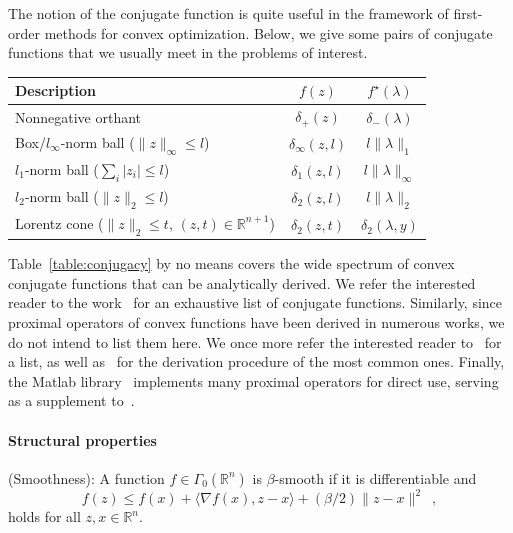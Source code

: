 \documentclass[openany]{now}
\newcommand{\reals}{{\mathbb R}}
\begin{document}
The notion of the conjugate function is quite useful in the framework of first-order methods for convex optimization.
Below, we give some pairs of conjugate functions that we usually meet in the problems of interest.
\begin{center}
    \begin{tabular}{ | l | c | c | }
    \hline
     Description & $f(z)$ & $f^{\star}(\lambda)$ \\ \hline\hline
     Nonnegative orthant & $\delta_+(z)$ & $\delta_-(\lambda)$ \\ \hline
     Box/$l_\infty$-norm ball ($\|z\|_{\infty}\leq l$) & $\delta_{\infty}(z,l)$ & $l\|\lambda\|_1$ \\ \hline
     $l_1$-norm ball ($\sum_i |z_i|\leq l$)  & $\delta_1(z,l)$ & $l\|\lambda\|_{\infty}$ \\ \hline
     $l_2$-norm ball ($\|z\|_2\leq l$)  & $\delta_2(z,l)$ & $l\|\lambda\|_2$ \\ \hline
     Lorentz cone ($\|z\|_2\leq t$, $(z,t)\in \reals^{n+1}$) & $\delta_2(z,t)$ & $\delta_2(\lambda,y)$ \\ \hline
    \end{tabular}
    {\label{table:conjugacy}}
\end{center}
Table~\ref{table:conjugacy} by no means covers the wide spectrum of convex conjugate functions that can be analytically derived. We refer the interested reader to the work~\cite{combettes2011proximal} for an exhaustive list of conjugate functions. Similarly, since proximal operators of convex functions have been derived in numerous works, we do not intend to list them here. We once more refer the interested reader to~\cite{combettes2011proximal} for a list, as well as~\cite{parikh2014proximal} for the derivation procedure of the most common ones. Finally, the Matlab library~\cite{proxMatlab} implements many proximal operators for direct use, serving as a supplement to~\cite{parikh2014proximal}. 

\paragraph{Structural properties}
 (Smoothness): A function $f\in\Gamma_0(\reals^n)$ is $\beta$-smooth if it is differentiable and
\[
 f(z) \le f(x) + \langle \nabla f(x), z-x\rangle + (\beta/2)\|z-x\|^2\enspace,
\]
holds for all $z,x\in\reals^n$.
\end{document}

